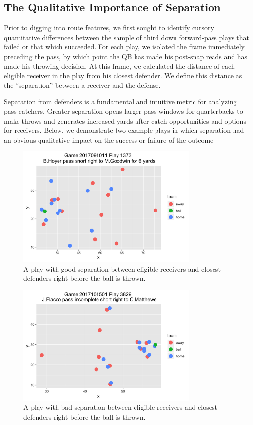 \documentclass[12pt,letterpaper]{article}
\begin{document}
\subsection*{The Qualitative Importance of Separation}

Prior to digging into route features, we first sought to identify cursory quantitative differences between the sample of third down forward-pass plays that failed or that which succeeded. For each play, we isolated the frame immediately preceding the pass, by which point the QB has made his post-snap reads and has made his throwing decision. At this frame, we calculated the distance of each eligible receiver in the play from his closest defender. We define this distance as the ``separation'' between a receiver and the defense. 

Separation from defenders is a fundamental and intuitive metric for analyzing pass catchers. Greater separation opens larger pass windows for quarterbacks to make throws and generates increased yards-after-catch opportunities and options for receivers. Below, we demonstrate two example plays in which separation had an obvious qualitative impact on the success or failure of the outcome. 

\begin{figure}[h!]
\centering
\includegraphics[width=0.8\textwidth]{good_separation.png}
\caption{A play with good separation between eligible receivers and closest defenders right before the ball is thrown.}
\end{figure}

\begin{figure}[h!]
\centering
\includegraphics[width=0.8\textwidth]{bad_separation.png}
\caption{A play with bad separation between eligible receivers and closest defenders right before the ball is thrown.}
\end{figure}
\end{document}
